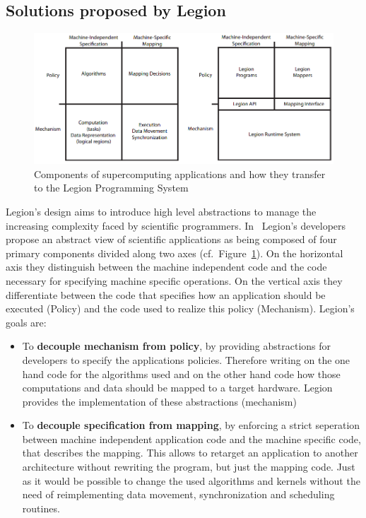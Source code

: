 \documentclass{article}      %
\begin{document}
\subsection{Solutions proposed by Legion}\label{sec:solutions}
\begin{figure}[htb]
	\centering
	\includegraphics[width=1.0\textwidth]{images/design_principles}
	\caption{Components of supercomputing applications and how they transfer to the Legion Programming System}\label{fig:design_principles}
\end{figure}
Legion's design aims to introduce high level abstractions to manage the increasing complexity faced by scientific programmers. In~\cite{BauerThesis} Legion's developers propose an abstract view of scientific applications as being composed of four primary components divided along two axes (cf.\ Figure~\hyperref[fig:design_principles]{\ref{fig:design_principles}}). On the horizontal axis they distinguish between the machine independent code and the code necessary for specifying machine specific operations. On the vertical axis they differentiate between the code that specifies how an application should be executed (Policy) and the code used to realize this policy (Mechanism). Legion’s goals are:
\begin{itemize}
\item To \textbf{decouple mechanism from policy}, by providing abstractions for developers to specify the applications policies. Therefore writing on the one hand code for the algorithms used and on the other hand code how those computations and data should be mapped to a target hardware. Legion provides the implementation of these abstractions (mechanism)

\item To \textbf{decouple specification from mapping}, by enforcing a strict seperation between machine independent application code and the machine specific code, that describes the mapping. This allows to retarget an application to another architecture without rewriting the program, but just the mapping code. Just as it would be possible to change the used algorithms and kernels without the need of reimplementing data movement, synchronization and scheduling routines.
\end{itemize}
\end{document}
